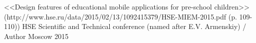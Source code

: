 \begin{cventries}
\cventry
{<<Design features of educational mobile applications for pre-school children>> (http://www.hse.ru/data/2015/02/13/1092415379/HSE-MIEM-2015.pdf (p. 109-110))} %
{HSE Scientific and Technical conference (named after E.V. Armenskiy) / Author} %
{Moscow} %
{2015} %
{}


\end{cventries}